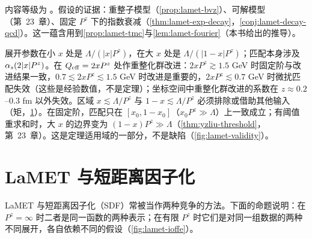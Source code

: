 内容等级为 \tagC。假设的证据：重整子模型（\cref{prop:lamet-bvz}）、可解模型（第~23~章）、固定 $P^z$ 下的指数衰减（\cref{thm:lamet-exp-decay}，\cref{conj:lamet-decay-qcd}）。这一蕴含用到\cref{prop:lamet-tmc}与\cref{lem:lamet-fourier}（本书给出的推导）。

\begin{remark}\label{rem:lamet-domain}
展开参数在小 $x$ 处是 $\Lambda/(|x|P^z)$，在大 $x$ 处是 $\Lambda/(|1-x|P^z)$；匹配本身涉及 $\alpha_s(2|x|P^z)$。在 $Q_{\rm eff}=2xP^z$ 处作重整化群改进\cite{Su:2022fiu}：$2xP^z\gtrsim1.5$ GeV 时固定阶与改进结果一致，$0.7\lesssim2xP^z\lesssim1.5$ GeV 时改进是重要的，$2xP^z\lesssim0.7$ GeV 时微扰匹配失效（这些是经验数值，不是定理）；坐标空间中重整化群改进的系数在 $z\approx0.2$--$0.3$ fm 以外失效。区域 $x\lesssim\Lambda/P^z$ 与 $1-x\lesssim\Lambda/P^z$ 必须排除或借助其他输入（矩，\cref{sec:lamet-sdf}）。在固定阶，匹配只在 $[x_0,1-x_0]$（$x_0P^z\gg\Lambda$）上一致成立；有阈值重求和时，大 $x$ 的边界变为 $(1-x)P^z\gg\Lambda$（\cref{thm:yzliu-threshold}，第~23~章）。这是定理适用域的一部分，不是缺陷（\cref{fig:lamet-validity}）。
\end{remark}

\section{LaMET 与短距离因子化}\label{sec:lamet-sdf}

LaMET 与短距离因子化（SDF）常被当作两种竞争的方法。下面的命题说明：在 $P^z=\infty$ 时二者是同一函数的两种表示；在有限 $P^z$ 时它们是对同一组数据的两种不同展开，各自依赖不同的假设（\cref{fig:lamet-ioffe}）。

